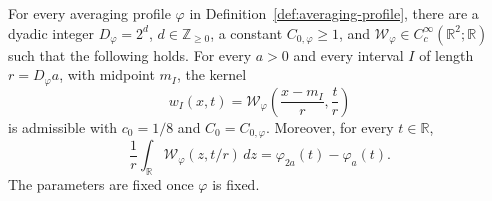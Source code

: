 \begin{lemma}
\label{lem:transfer-kernel}
For every averaging profile \(\varphi\) in
Definition~\ref{def:averaging-profile}, there are a dyadic integer
\(D_\varphi=2^d\), \(d\in\mathbb Z_{\geq0}\), a constant
\(C_{0,\varphi}\geq1\), and
\(\mathcal W_\varphi\in C_c^\infty(\mathbb R^2;\mathbb R)\) such that
the following holds.  For every \(a>0\) and every interval \(I\) of
length \(r=D_\varphi a\), with midpoint \(m_I\), the kernel
\[
 w_I(x,t)=\mathcal W_\varphi\left(\frac{x-m_I}{r},\frac{t}{r}\right)
\]
is admissible with \(c_0=1/8\) and \(C_0=C_{0,\varphi}\).  Moreover, for
every \(t\in\mathbb R\),
\begin{equation}
 \frac1r\int_{\mathbb R}\mathcal W_\varphi(z,t/r)\,dz
    =\varphi_{2a}(t)-\varphi_a(t).
 \label{eq:transfer-kernel-normalization}
\end{equation}
The parameters are fixed once \(\varphi\) is fixed.
\end{lemma}


